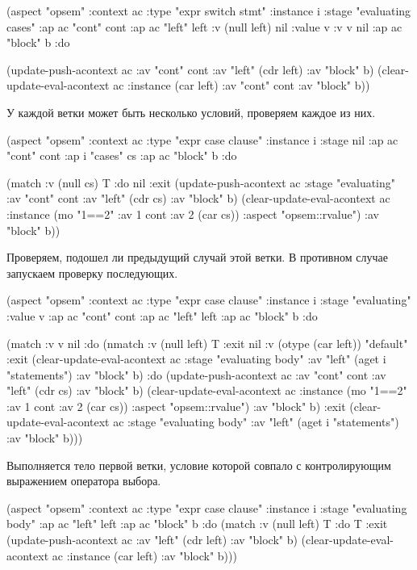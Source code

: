 \documentclass[12pt,twoside,russian]{article}
\begin{document}
\begin{ABMLCode}
(aspect "opsem" :context ac :type "expr switch stmt" :instance i 
  :stage "evaluating cases" :ap ac "cont" cont :ap ac "left" left 
  :v (null left) nil :value v :v v nil :ap ac "block" b :do 
  
  (update-push-acontext ac :av "cont" cont :av "left" (cdr left) 
    :av "block" b)
  (clear-update-eval-acontext ac :instance (car left) :av "cont" cont 
    :av "block" b))
\end{ABMLCode}

У каждой ветки может быть несколько условий, проверяем каждое из них.

\begin{ABMLCode}
(aspect "opsem" :context ac :type "expr case clause" :instance i 
  :stage nil :ap ac "cont" cont :ap i "cases" cs :ap ac "block" b :do 
  
  (match :v (null cs) T :do nil 
  :exit 
  (update-push-acontext ac :stage "evaluating" :av "cont" cont 
    :av "left" (cdr cs) :av "block" b)
  (clear-update-eval-acontext ac 
    :instance (mo "1==2" :av 1 cont :av 2 (car cs)) 
    :aspect "opsem::rvalue") :av "block" b))
\end{ABMLCode}

Проверяем, подошел ли предыдущий случай этой ветки. В противном случае запускаем проверку последующих.

\begin{ABMLCode}
(aspect "opsem" :context ac :type "expr case clause" :instance i 
  :stage "evaluating" :value v :ap ac "cont" cont :ap ac "left" left 
  :ap ac "block" b :do 
    
  (match :v v nil 
  :do (nmatch :v (null left) T :exit nil 
    :v (otype (car left)) "default" 
    :exit 
    (clear-update-eval-acontext ac :stage "evaluating body" 
      :av "left" (aget i "statements") :av "block" b)
    :do 
    (update-push-acontext ac :av "cont" cont :av "left" (cdr cs) 
      :av "block" b)
    (clear-update-eval-acontext ac :instance (mo "1==2" :av 1 cont 
      :av 2 (car cs)) :aspect "opsem::rvalue") :av "block" b)
  :exit (clear-update-eval-acontext ac :stage "evaluating body" 
    :av "left" (aget i "statements") :av "block" b)))
\end{ABMLCode}

Выполняется тело первой ветки, условие которой совпало с контролирующим выражением оператора выбора.

\begin{ABMLCode}
(aspect "opsem" :context ac :type "expr case clause" :instance i 
  :stage "evaluating body" :ap ac "left" left :ap ac "block" b :do 
  (match :v (null left) T :do T :exit 
    (update-push-acontext ac :av "left" (cdr left) :av "block" b)
    (clear-update-eval-acontext ac :instance (car left) :av "block" b)))
\end{ABMLCode}
\end{document}
